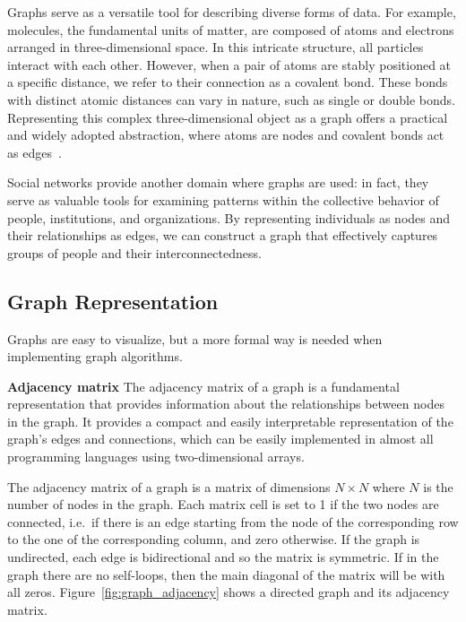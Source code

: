 Graphs serve as a versatile tool for describing diverse forms of data.
For example, molecules, the fundamental units of matter, are composed of atoms and electrons arranged in three-dimensional space.
In this intricate structure, all particles interact with each other.
However, when a pair of atoms are stably positioned at a specific distance, we refer to their connection as a covalent bond.
These bonds with distinct atomic distances can vary in nature, such as single or double bonds.
Representing this complex three-dimensional object as a graph offers a practical and widely adopted abstraction, where atoms are nodes and covalent bonds act as edges~\cite{DBLP:journals/corr/DuvenaudMAGHAA15}.

Social networks provide another domain where graphs are used: in fact, they serve as valuable tools for examining patterns within the collective behavior of people, institutions, and organizations.
By representing individuals as nodes and their relationships as edges, we can construct a graph that effectively captures groups of people and their interconnectedness.

\subsection{Graph Representation}
\label{subsec:graph_representation}

Graphs are easy to visualize, but a more formal way is needed when implementing graph algorithms.

\textbf{Adjacency matrix} \newline
The adjacency matrix of a graph is a fundamental representation that provides information about the relationships between nodes in the graph.
It provides a compact and easily interpretable representation of the graph's edges and connections, which can be easily implemented in almost all programming languages using two-dimensional arrays.

The adjacency matrix of a graph is a matrix of dimensions $N \times N$ where $N$ is the number of nodes in the graph.
Each matrix cell is set to 1 if the two nodes are connected, i.e.\ if there is an edge starting from the node of the corresponding row to the one of the corresponding column, and zero otherwise.
If the graph is undirected, each edge is bidirectional and so the matrix is symmetric.
If in the graph there are no self-loops, then the main diagonal of the matrix will be with all zeros.
Figure~\ref{fig:graph_adjacency} shows a directed graph and its adjacency matrix.


